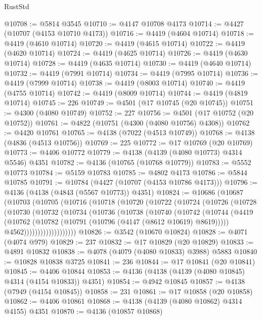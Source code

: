 \begin{lexlean}{RustStd}
\begin{coremodule}
@10708 := @5814 @3545
@10710 := @4147 @10708 @4173
@10714 := @4427 (@10707 (@4153 @10710 @4173))
@10716 := @4419 (@4604 @10714)
@10718 := @4419 (@4610 @10714)
@10720 := @4419 (@4615 @10714)
@10722 := @4419 (@4620 @10714)
@10724 := @4419 (@4625 @10714)
@10726 := @4419 (@4630 @10714)
@10728 := @4419 (@4635 @10714)
@10730 := @4419 (@4640 @10714)
@10732 := @4419 (@7991 @10714)
@10734 := @4419 (@7995 @10714)
@10736 := @4419 (@7999 @10714)
@10738 := @4419 (@8003 @10714)
@10740 := @4419 (@4755 @10714)
@10742 := @4419 (@8009 @10714)
@10744 := @4419 (@4819 @10714)
@10745 := 226
@10749 := @4501 (@17 @10745 (@20 @10745))
@10751 := @4300 (@4080 @10749)
@10752 := 227
@10756 := @4501 (@17 @10752 (@20 @10752))
@10761 := @4822 (@10751 (@4300 (@4080 @10756) @4308))
@10762 := @4420 @10761
@10765 := @4138 (@7022 (@4513 @10749))
@10768 := @4138 (@4836 (@4513 @10756))
@10769 := 225
@10772 := @17 @10769 (@20 @10769)
@10773 := @4406 @10772
@10779 := @4138 (@4139 (@4080 @10773) @4314 @5546) @4351
@10782 := @4136 (@10765 (@10768 @10779))
@10783 := @5552 @10773
@10784 := @5159 @10783
@10785 := @4802 @4173
@10786 := @5844 @10785
@10791 := @10784 (@4427 (@10707 (@4153 @10786 @4173)))
@10796 := @4136 (@4138 (@4843 (@5567 @10773)) @4351)
@10824 := @10686
    (@10687
      (@10703
        (@10705
          (@10716
            (@10718
              (@10720
                (@10722
                  (@10724
                    (@10726
                      (@10728
                        (@10730
                          (@10732
                            (@10734
                              (@10736
                                (@10738
                                  (@10740
                                    (@10742
                                      (@10744
                                        (@4419
                                          (@10762
                                            (@10782 (@10791 (@10796 (@4147 (@8612 @10619) @8619)))))
                                          @4562)))))))))))))))))))
@10826 := @3542 (@10670 @10824)
@10828 := @4071 (@4074 @979)
@10829 := 237
@10832 := @17 @10829 (@20 @10829)
@10833 := @4891 @10832
@10838 := @4078 (@4079 (@4080 @10833) @3988) @5883
@10840 := @10828 @10838 @3725
@10841 := 236
@10844 := @17 @10841 (@20 @10841)
@10845 := @4406 @10844
@10853 := @4136 (@4138 (@4139 (@4080 @10845) @4314 (@4154 @10833)) @4351)
@10854 := @4942 @10845
@10857 := @4138 (@7949 (@4154 @10845))
@10858 := 231
@10861 := @17 @10858 (@20 @10858)
@10862 := @4406 @10861
@10868 := @4138 (@4139 (@4080 @10862) @4314 @4155) @4351
@10870 := @4136 (@10857 @10868)

\end{coremodule}
\end{lexlean}
